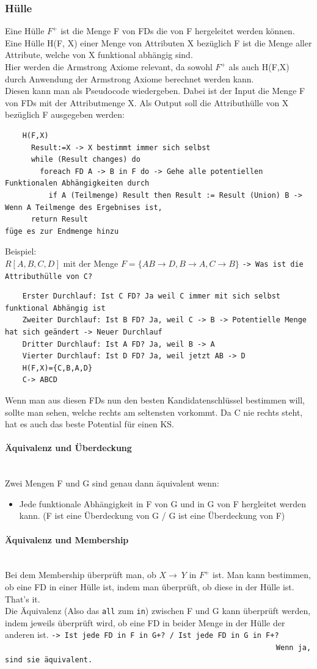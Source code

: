 \documentclass{article}
\newcommand{\paragraphlb}[1]{\paragraph{#1}\mbox{}\\}
\begin{document}
	\subsubsection{Hülle}
	Eine Hülle $F^+$ ist die Menge F von FDs die von F hergeleitet werden können. Eine Hülle H(F, X) einer Menge von Attributen X bezüglich F ist die Menge aller Attribute, welche von X funktional abhängig sind. \\
	Hier werden die Armstrong Axiome relevant, da sowohl $F^+$ als auch H(F,X) durch Anwendung der Armstrong Axiome berechnet werden kann. \\
	Diesen kann man als Pseudocode wiedergeben. Dabei ist der Input die Menge F von FDs mit der Attributmenge X. Als Output soll die Attributhülle von X bezüglich F ausgegeben werden:
	\begin{verbatim}
	H(F,X)
	  Result:=X -> X bestimmt immer sich selbst
	  while (Result changes) do
	    foreach FD A -> B in F do -> Gehe alle potentiellen Funktionalen Abhängigkeiten durch
	      if A (Teilmenge) Result then Result := Result (Union) B -> Wenn A Teilmenge des Ergebnises ist, 
	  return Result                                                  füge es zur Endmenge hinzu
	\end{verbatim}
	Beispiel: \\
	$R[A, B, C, D]$ mit der Menge $F=\{AB\to D, B\to A, C\to B\}$ \verb|-> Was ist die Attributhülle von C?|
	\begin{verbatim}
	Erster Durchlauf: Ist C FD? Ja weil C immer mit sich selbst funktional Abhängig ist
	Zweiter Durchlauf: Ist B FD? Ja, weil C -> B -> Potentielle Menge hat sich geändert -> Neuer Durchlauf
	Dritter Durchlauf: Ist A FD? Ja, weil B -> A
	Vierter Durchlauf: Ist D FD? Ja, weil jetzt AB -> D
	H(F,X)={C,B,A,D}
	C-> ABCD
	\end{verbatim}
	Wenn man aus diesen FDs nun den besten Kandidatenschlüssel bestimmen will, sollte man sehen, welche rechts am seltensten vorkommt. Da C nie rechts steht, hat es auch das beste Potential für einen KS.
	\paragraphlb{Äquivalenz und Überdeckung}
	Zwei Mengen F und G sind genau dann äquivalent wenn:
	\begin{itemize}
		\item{Jede funktionale Abhängigkeit in F von G und in G von F hergleitet werden kann. (F ist eine Überdeckung von G / G ist eine Überdeckung von F)}
	\end{itemize}
	\paragraphlb{Äquivalenz und Membership}
	Bei dem Membership überprüft man, ob $X\to\ Y$ in $F^+$ ist. Man kann bestimmen, ob eine FD in einer Hülle ist, indem man überprüft, ob diese in der Hülle ist. That's it. \\
	Die Äquivalenz (Also das \verb|all| zum \verb|in|) zwischen F und G kann überprüft werden, indem jeweils überprüft wird, ob eine FD in beider Menge in der Hülle der anderen ist. \verb|-> Ist jede FD in F in G+? / Ist jede FD in G in F+?| \\
	\verb|                                                              Wenn ja, sind sie äquivalent.|
\end{document}
